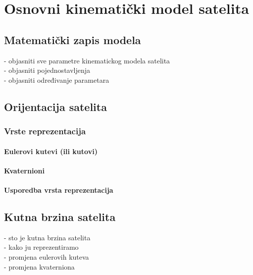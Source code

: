 \documentclass[times, utf8, diplomski, numeric]{templates/template}
\begin{document}
\chapter{Osnovni kinematički model satelita}{
    \section{Matematički zapis modela}{
        - objasniti sve parametre kinematickog modela satelita\\
        - objasniti pojednostavljenja\\
        - objasniti određivanje parametara\\
    }
    
    \section{Orijentacija satelita}{   
        \subsection{Vrste reprezentacija}{
            \subsubsection{Eulerovi kutevi (ili kutovi)}{

            }

            \subsubsection{Kvaternioni}{

            }

            \subsubsection{Usporedba vrsta reprezentacija}{
    
            }
        }
    }
    
    \section{Kutna brzina satelita}{
        - sto je kutna brzina satelita\\
        - kako ju reprezentiramo\\
            - promjena eulerovih kuteva\\
            - promjena kvaterniona\\
    }
}
    
\end{document}
